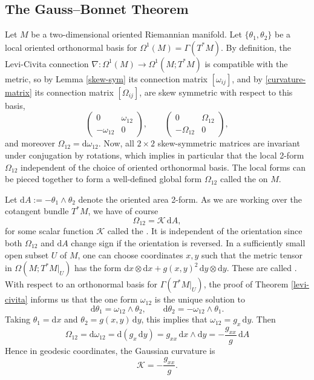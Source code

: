 \documentclass[a4paper,openany]{scrbook}
\newcommand{\ud}{\mathrm{d}}
\begin{document}
\subsection{The Gauss--Bonnet Theorem}

Let $M$ be a two-dimensional oriented Riemannian manifold. Let $\{\theta_1,\theta_2\}$ be a local oriented orthonormal basis for $\Omega^1(M)=\Gamma(T^*M)$. By definition, the 
Levi-Civita connection $\nabla:\Omega^1(M)\to\Omega^1(M;T^*M)$ is compatible with the metric, so by Lemma \ref{skew-sym} its connection matrix $[\omega_{ij}]$, and by \eqref{curvature-matrix} its connection matrix $[\Omega_{ij}]$, are skew symmetric with respect to this basis,
\begin{equation*}
\begin{pmatrix}0&\omega_{12}\\-\omega_{12}&0\end{pmatrix},\qquad\begin{pmatrix}0&\Omega_{12}\\-\Omega_{12}&0\end{pmatrix},
\end{equation*}
and moreover $\Omega_{12}=\ud\omega_{12}$. Now, all $2\times2$ skew-symmetric matrices are invariant under conjugation by rotations, which implies in particular that the local 2-form $\Omega_{12}$ independent of the choice of oriented orthonormal basis. The local forms can be pieced together to form a well-defined global form $\Omega_{12}$ called the  on $M$.

Let $\ud A:=-\theta_1\wedge\theta_2$ denote the oriented area 2-form. As we are working over the cotangent bundle $T^*M$, we have of course
\begin{equation*}
\Omega_{12}=\mathcal{K}\,\ud A,
\end{equation*}
for some scalar function $\mathcal{K}$ called the . It is independent of the orientation since both $\Omega_{12}$ and $\ud A$ change sign if the orientation is reversed. In a sufficiently small open subset $U$ of $M$, one can choose coordinates $x,y$ such that the metric tensor in $\Omega(M;T^*M|_U)$ has the form $\ud x\otimes\ud x+g(x,y)^2\,\ud y\otimes\ud y$. These are called . With respect to an orthonormal basis for $\Gamma(T^*M|_U)$, the proof of Theorem \ref{levi-civita} informs us that the one form $\omega_{12}$ is the unique solution to
\begin{equation*}
\ud\theta_1=\omega_{12}\wedge\theta_2,\qquad\ud\theta_2=-\omega_{12}\wedge\theta_1.
\end{equation*}
Taking $\theta_1=\ud x$ and $\theta_2=g(x,y)\,\ud y$, this implies that $\omega_{12}=g_x\,\ud y$. Then
\begin{equation*}
\Omega_{12}=\ud\omega_{12}=\ud(g_x\,\ud y)=g_{xx}\,\ud x\wedge\ud y=-\frac{g_{xx}}{g}\,\ud A
\end{equation*}
Hence in geodesic coordinates, the Gaussian curvature is
\begin{equation*}
\mathcal{K}=-\frac{g_{xx}}{g}.
\end{equation*}
\end{document}

